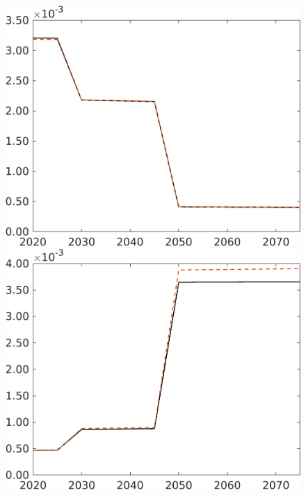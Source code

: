 \begin{figure}[h!!]
\begin{minipage}[]{0.32\textwidth}
\end{minipage}
	\begin{minipage}[]{0.32\textwidth}
		\includegraphics[width=1\textwidth]{../../codding_model/own_basedOnFried/optimalPol_elastS_DisuSci/figures/all_1705/comp_notaul_OPT_T_NoTaus_Lf_spillover0_sep1_BN0_ineq0_etaa0.79.png}
	\end{minipage}
	\begin{minipage}[]{0.32\textwidth}
		\includegraphics[width=1\textwidth]{../../codding_model/own_basedOnFried/optimalPol_elastS_DisuSci/figures/all_1705/comp_notaul_OPT_T_NoTaus_Lg_spillover0_sep1_BN0_ineq0_etaa0.79.png}

\end{minipage}
\end{figure}
